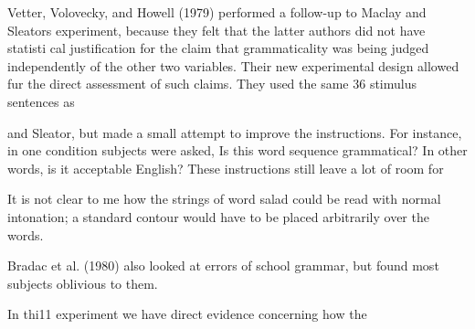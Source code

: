 \begin{styleStandard}
Vetter, Volovecky, and Howell (1979) performed a follow-up to Maclay and Sleator{\textquotesingle}s experiment, because they felt that the latter authors did not have statisti\- cal justification for the claim that grammaticality was being judged independently of the other two variables. Their new experimental design allowed fur the direct assessment of such claims. They used the same 36 stimulus sentences as
\end{styleStandard}


\begin{styleStandard}
and Sleator, but made a small attempt to improve the instructions. For instance, in one condition subjects were asked, {\textquotedbl}Is this word sequence grammatical? In other words, is it acceptable English?{\textquotedbl} These instructions still leave a lot of room for
\end{styleStandard}


\setcounter{listWWNumxxxiileveli}{5}
\begin{listWWNumxxxiileveli}
\item 
\begin{styleStandard}
It is not clear to me how the strings of word salad could be read with normal intonation; a standard contour would have to be placed arbitrarily over the words.
\end{styleStandard}


\item 
\begin{styleStandard}
Bradac et al. (1980) also looked at errors of {\textquotedbl}school grammar,{\textquotedbl} but found most subjects oblivious to them.
\end{styleStandard}


\end{listWWNumxxxiileveli}
\clearpage\setcounter{page}{1}\begin{styleTextbody}
In thi11 experiment we have direct evidence concerning how the
\end{styleTextbody}


